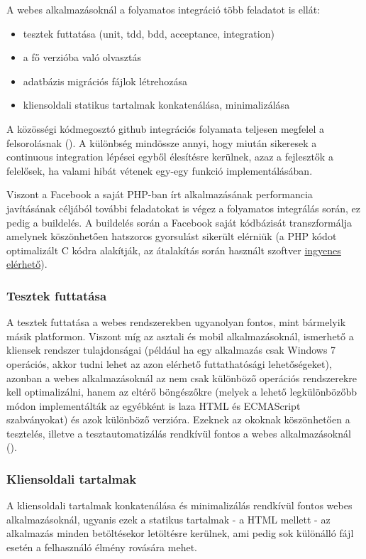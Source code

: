 A webes alkalmazásoknál a folyamatos integráció több feladatot is ellát:
\begin{itemize}
	\item tesztek futtatása (unit, tdd, bdd, acceptance, integration)
	\item a fő verzióba való olvasztás
	\item adatbázis migrációs fájlok létrehozása
	\item kliensoldali statikus tartalmak konkatenálása, minimalizálása
\end{itemize}

A közösségi kódmegosztó github integrációs folyamata teljesen megfelel a felsorolásnak (\cite{github_deployment_web}). A különbség mindössze annyi, hogy miután sikeresek a continuous integration lépései egyből élesítésre kerülnek, azaz a fejlesztők a felelősek, ha valami hibát vétenek egy-egy funkció implementálásában.

Viszont a Facebook a saját PHP-ban írt alkalmazásának performancia javításának céljából további feladatokat is végez a folyamatos integrálás során, ez pedig a buildelés. A buildelés során a Facebook saját kódbázisát transzformálja amelynek köszönhetően hatszoros gyorsulást sikerült elérniük (a PHP kódot optimalizált C kódra alakítják, az átalakítás során használt szoftver \href{https://github.com/facebook/hiphop-php}{ingyenes elérhető}). \cite{facebook_deployment}
\subsubsection{Tesztek futtatása}
A tesztek futtatása a webes rendszerekben ugyanolyan fontos, mint bármelyik másik platformon. Viszont míg az asztali és mobil alkalmazásoknál, ismerhető a kliensek rendszer tulajdonságai (például ha egy alkalmazás csak Windows 7 operációs, akkor tudni lehet az azon elérhető futtathatósági lehetőségeket), azonban a webes alkalmazásoknál az nem csak különböző operációs rendszerekre kell optimalizálni, hanem az eltérő böngészőkre (melyek a lehető legkülönbözőbb módon implementálták az egyébként is laza HTML és ECMAScript szabványokat) és azok különböző verzióra. Ezeknek az okoknak köszönhetően a tesztelés, illetve a tesztautomatizálás rendkívül fontos a webes alkalmazásoknál (\cite{tddjs}).

\subsubsection{Kliensoldali tartalmak}
A kliensoldali tartalmak konkatenálása és minimalizálás rendkívül fontos webes alkalmazásoknál, ugyanis ezek a statikus tartalmak - a HTML mellett - az alkalmazás minden betöltésekor letöltésre kerülnek, ami pedig sok különálló fájl esetén a felhasználó élmény rovására mehet.
